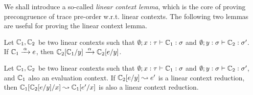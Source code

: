 \documentclass[10pt,a4]{article}
\begin{document}
We shall introduce a so-called {\em linear context lemma}, which is the core of 
proving precongruence of trace pre-order w.r.t. linear contexts. 
The following two lemmas are useful for proving the linear context lemma.

\begin{lemma}
Let $\mathbb{C}_1, \mathbb{C}_2$ be two linear contexts such that 
$\emptyset; x: \tau \vdash \mathbb{C}_1 : \sigma$ and $ \emptyset; y : \sigma \vdash \mathbb{C}_2 : \sigma'$.
If $\mathbb{C}_1 \xrightarrow{\,{\alpha}\,} e$, then $\mathbb{C}_2[\mathbb{C}_1/y] \xrightarrow{\,{\alpha}\,} \mathbb{C}_2[e/y]$.
\end{lemma}

\begin{lemma}
Let $\mathbb{C}_1, \mathbb{C}_2$ be two linear contexts such that 
$\emptyset; x: \tau \vdash \mathbb{C}_1 : \sigma$ and $ \emptyset; y : \sigma \vdash \mathbb{C}_2 : \sigma'$, 
and $\mathbb{C}_1$ also an evaluation context.
If $\mathbb{C}_2[e/y] \leadsto e'$ is a linear context reduction, 
then $\mathbb{C}_1[\mathbb{C}_2[e/y]/x] \leadsto \mathbb{C}_1[e'/x]$ is also a linear context reduction. 
\end{lemma}
\end{document}
